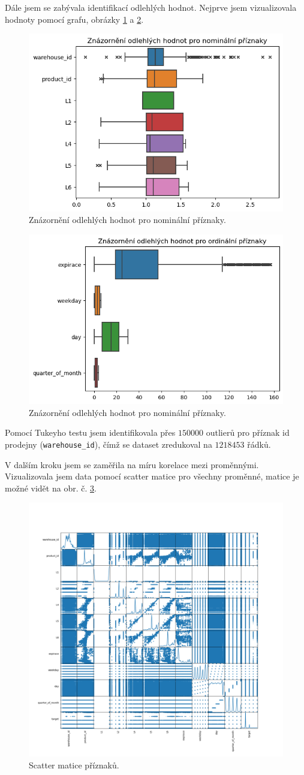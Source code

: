 Dále jsem se zabývala identifikací odlehlých hodnot. Nejprve jsem vizualizovala hodnoty pomocí grafu, obrázky \ref*{obr:rok:g:outlierN} a \ref*{obr:rok:g:outlierO}. %

\begin{figure}[hbtp!]
    \centering
    \includegraphics[width=.5\textwidth]{obrazky/zntb/box_nominal.png}
    \caption{Znázornění odlehlých hodnot pro nominální příznaky.}
    \label{obr:rok:g:outlierN}
\end{figure}
\begin{figure}[hbtp!]
    \centering
    \includegraphics[width=.5\textwidth]{obrazky/zntb/box_ordinal.png}
    \caption{Znázornění odlehlých hodnot pro nominální příznaky.}
    \label{obr:rok:g:outlierO}
\end{figure}

Pomocí Tukeyho testu jsem identifikovala přes $150 000$ outlierů pro příznak id prodejny (\texttt{warehouse\_id}), čímž se dataset zredukoval na $1 218 453$ řádků.

V dalším kroku jsem se zaměřila na míru korelace mezi proměnnými. Vizualizovala jsem data pomocí scatter matice pro všechny proměnné, matice je možné vidět na obr. č. \ref*{obr:nb:scatter}.

\begin{figure}[hbtp!]
    \centering
    \includegraphics[width=.6\textwidth]{obrazky/zntb/MyScatter.png}
    \caption{Scatter matice příznaků.}
    \label{obr:nb:scatter}
\end{figure}
 

